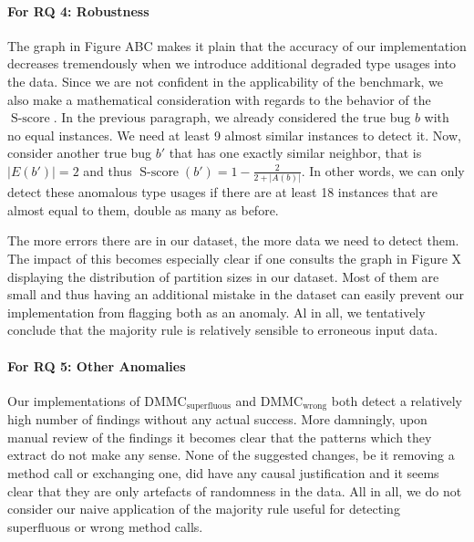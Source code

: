 
\paragraph{For RQ 4: Robustness}

The graph in Figure ABC makes it plain that the accuracy of our implementation decreases tremendously when we introduce additional degraded type usages into the data.
Since we are not confident in the applicability of the benchmark, we also make a mathematical consideration with regards to the behavior of the $\operatorname{S-score}$.
In the previous paragraph, we already considered the true bug $b$ with no equal instances.
We need at least 9 almost similar instances to detect it.
Now, consider another true bug $b'$ that has one exactly similar neighbor, that is $|E(b')|=2$ and thus $\operatorname{S-score}(b')=1-\frac{2}{2+|A(b)|}$.
In other words, we can only detect these anomalous type usages if there are at least 18 instances that are almost equal to them, double as many as before.

The more errors there are in our dataset, the more data we need to detect them.
The impact of this becomes especially clear if one consults the graph in Figure X displaying the distribution of partition sizes in our dataset.
Most of them are small and thus having an additional mistake in the dataset can easily prevent our implementation from flagging both as an anomaly.
Al in all, we tentatively conclude that the majority rule is relatively sensible to erroneous input data.

\paragraph{For RQ 5: Other Anomalies}

Our implementations of $\text{DMMC}_\text{superfluous}$ and $\text{DMMC}_\text{wrong}$ both detect a relatively high number of findings without any actual success.
More damningly, upon manual review of the findings it becomes clear that the patterns which they extract do not make any sense.
None of the suggested changes, be it removing a method call or exchanging one, did have any causal justification and it seems clear that they are only artefacts of randomness in the data.
All in all, we do not consider our naive application of the majority rule useful for detecting superfluous or wrong method calls.

